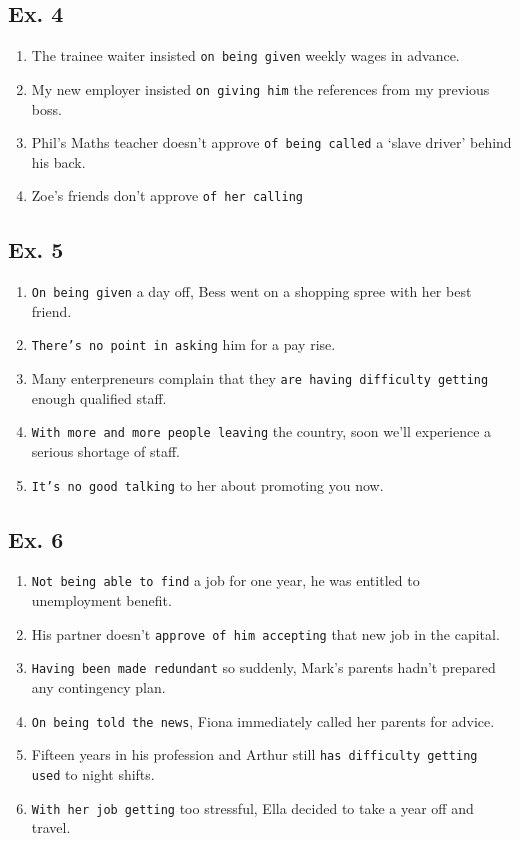 \documentclass[a4paper]{article}
\begin{document}
\subsection{Ex. 4}
\begin{enumerate}
  \item The trainee waiter insisted {\tt on being given} weekly wages in advance.
  \item My new employer insisted {\tt on giving him} the references from my previous boss.
  \item Phil's Maths teacher doesn't approve {\tt of being called} a `slave driver' behind his back.
  \item Zoe's friends don't approve {\tt of her calling}
\end{enumerate}

\subsection{Ex. 5}
\begin{enumerate}
  \item {\tt On being given} a day off, Bess went on a shopping spree with her best friend.
  \item {\tt There's no point in asking} him for a pay rise.
  \item Many enterpreneurs complain that they {\tt are having difficulty getting} enough qualified staff.
  \item {\tt With more and more people leaving} the country, soon we'll experience a serious shortage of staff.
  \item {\tt It's no good talking} to her about promoting you now.
\end{enumerate}


\subsection{Ex. 6}
\begin{enumerate}
  \item {\tt Not being able to find} a job for one year, he was entitled to unemployment benefit.
  \item His partner doesn't {\tt approve of him accepting} that new job in the capital.
  \item {\tt Having been made redundant} so suddenly, Mark's parents hadn't prepared any contingency plan.
  \item {\tt On being told the news}, Fiona immediately called her parents for advice.
  \item Fifteen years in his profession and Arthur still {\tt has difficulty getting used} to night shifts.
  \item {\tt With her job getting} too stressful, Ella decided to take a year off and travel.
\end{enumerate}
\end{document}
